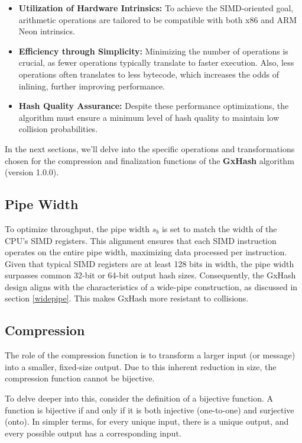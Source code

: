 \documentclass[10pt]{article}
\begin{document}
\begin{itemize}
    \item \textbf{Utilization of Hardware Intrinsics:} To achieve the SIMD-oriented goal, arithmetic operations are tailored to be compatible with both x86 and ARM Neon intrinsics.
    \item \textbf{Efficiency through Simplicity:} Minimizing the number of operations is crucial, as fewer operations typically translate to faster execution. Also, less operations often translates to less bytecode, which increases the odds of inlining, further improving performance.
    \item \textbf{Hash Quality Assurance:} Despite these performance optimizations, the algorithm must ensure a minimum level of hash quality to maintain low collision probabilities.
\end{itemize}

In the next sections, we'll delve into the specific operations and transformations chosen for the compression and finalization functions of the \textbf{GxHash} algorithm (version 1.0.0).

\subsection{Pipe Width}

To optimize throughput, the pipe width \( s_b \) is set to match the width of the CPU's SIMD registers. This alignment ensures that each SIMD instruction operates on the entire pipe width, maximizing data processed per instruction. Given that typical SIMD registers are at least 128 bits in width, the pipe width surpasses common 32-bit or 64-bit output hash sizes. Consequently, the GxHash design aligns with the characteristics of a wide-pipe construction, as discussed in section \ref{widepipe}.
This makes GxHash more resistant to collisions.

\subsection{Compression}

The role of the compression function is to transform a larger input (or message) into a smaller, fixed-size output. Due to this inherent reduction in size, the compression function cannot be bijective.

To delve deeper into this, consider the definition of a bijective function. A function is bijective if and only if it is both injective (one-to-one) and surjective (onto). In simpler terms, for every unique input, there is a unique output, and every possible output has a corresponding input.
\end{document}
